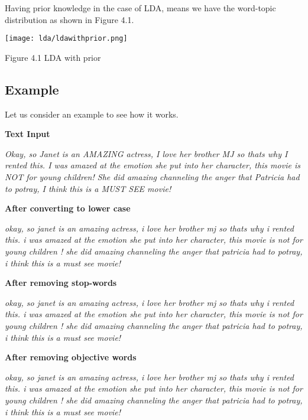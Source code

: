 Having prior knowledge in the case of LDA, means we have the word-topic distribution as shown in Figure 4.1.

\texttt{[image: lda/ldawithprior.png]} 
\begin{center}
 Figure 4.1 LDA with prior
\end{center}

\subsection{Example}

Let us consider an example to see how it works. 

\textbf{Text Input}

\textit{ Okay, so Janet is an AMAZING actress, I love her brother MJ so thats why I rented this. I was amazed at the emotion she put into her character, this 
movie is NOT for young children! She did amazing channeling the anger that Patricia had to potray, I think this is a MUST SEE movie!}

\textbf{After converting to lower case}

\textit{ okay, so janet is an amazing actress, i love her brother mj so thats why i rented this. i was amazed at the emotion she put into her character, this 
movie is not for young children ! she did amazing channeling the anger that patricia had to potray, i think this is a must see movie!}

\textbf{After removing stop-words}

\textit{ {\color[rgb]{0.4,0.4,0.4}okay, so} janet {\color[rgb]{0.4,0.4,0.4}is an} amazing actress, {\color[rgb]{0.4,0.4,0.4}i} love {\color[rgb]{0.4,0.4,0.4}her}
brother mj {\color[rgb]{0.4,0.4,0.4}so thats why i} rented {\color[rgb]{0.4,0.4,0.4}this}. {\color[rgb]{0.4,0.4,0.4}i was} amazed {\color[rgb]{0.4,0.4,0.4}at the}
emotion {\color[rgb]{0.4,0.4,0.4}she put into her} character, {\color[rgb]{0.4,0.4,0.4}this} movie {\color[rgb]{0.4,0.4,0.4}is not for} young children ! 
{\color[rgb]{0.4,0.4,0.4}she did} amazing channeling {\color[rgb]{0.4,0.4,0.4}the} anger {\color[rgb]{0.4,0.4,0.4}that} patricia {\color[rgb]{0.4,0.4,0.4}had to} 
potray, {\color[rgb]{0.4,0.4,0.4}i} think {\color[rgb]{0.4,0.4,0.4}this is a} must {\color[rgb]{0.4,0.4,0.4}see} movie!}

\textbf{After removing objective words}

\textit{ {\color[rgb]{0.4,0.4,0.4}okay, so janet is an} amazing {\color[rgb]{0.4,0.4,0.4}actress, i} love {\color[rgb]{0.4,0.4,0.4}her brother mj so thats why i rented 
this. i was} amazed {\color[rgb]{0.4,0.4,0.4}at the emotion she put into her character, this movie is not for young children ! she did} amazing {\color[rgb]{0.4,0.4,0.4}channeling 
the} anger {\color[rgb]{0.4,0.4,0.4}that patricia had to potray, i think this is a must see movie! }}


